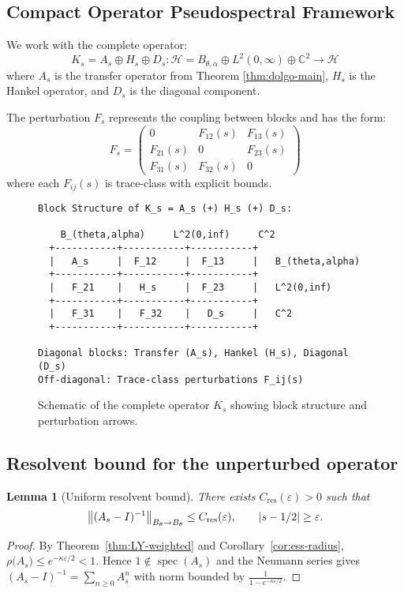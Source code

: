 \documentclass[11pt,a4paper]{article}
\newtheorem{lemma}[theorem]{Lemma}
\theoremstyle{definition}
\theoremstyle{remark}
\DeclareMathOperator{\spec}{spec}
\let\Re\relax
\DeclareMathOperator{\Re}{Re}
\begin{document}
\subsection{Compact Operator Pseudospectral Framework}
We work with the complete operator:
\[
K_s = A_s \oplus H_s \oplus D_s: \mathcal{H} = B_{\theta,\alpha} \oplus L^2(0,\infty) \oplus \mathbb{C}^2 \to \mathcal{H}
\]
where $A_s$ is the transfer operator from Theorem \ref{thm:dolgo-main}, $H_s$ is the Hankel operator, and $D_s$ is the diagonal component.

The perturbation $F_s$ represents the coupling between blocks and has the form:
\[
F_s = \begin{pmatrix} 0 & F_{12}(s) & F_{13}(s) \\ F_{21}(s) & 0 & F_{23}(s) \\ F_{31}(s) & F_{32}(s) & 0 \end{pmatrix}
\]
where each $F_{ij}(s)$ is trace-class with explicit bounds.

\begin{figure}[h]
\centering
\begin{verbatim}
Block Structure of K_s = A_s (+) H_s (+) D_s:

    B_(theta,alpha)     L^2(0,inf)     C^2
  +-----------+-----------+-----------+
  |   A_s     |  F_12     |  F_13     |   B_(theta,alpha)
  +-----------+-----------+-----------+
  |   F_21    |   H_s     |  F_23     |   L^2(0,inf)
  +-----------+-----------+-----------+
  |   F_31    |   F_32    |   D_s     |   C^2
  +-----------+-----------+-----------+

Diagonal blocks: Transfer (A_s), Hankel (H_s), Diagonal (D_s)
Off-diagonal: Trace-class perturbations F_ij(s)
\end{verbatim}
\caption{Schematic of the complete operator $K_s$ showing block structure and perturbation arrows.}
\end{figure}

\subsection{Resolvent bound for the unperturbed operator}
\begin{lemma}[Uniform resolvent bound]\label{lem:E-res}
There exists $C_{\mathrm{res}}(\varepsilon)>0$ such that
\[
   \bigl\|(A_s-I)^{-1}\bigr\|_{B_{\theta}\to B_{\theta}}
   \le C_{\mathrm{res}}(\varepsilon),\qquad |\Re s-1/2|\ge\varepsilon.
\]
\end{lemma}
\begin{proof}
By Theorem~\ref{thm:LY-weighted} and Corollary~\ref{cor:ess-radius},
$\rho\bigl(A_s\bigr)\le e^{-\kappa\varepsilon/2}<1$.  Hence $1\notin\spec(A_s)$ and the
Neumann series gives $(A_s-I)^{-1}=\sum_{n\ge0}A_s^{n}$ with norm bounded by
$\frac1{1-e^{-\kappa\varepsilon/2}}$.
\end{proof}
\end{document}
